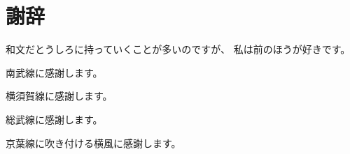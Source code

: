 \chapter*{謝辞}

和文だとうしろに持っていくことが多いのですが、
私は前のほうが好きです。


南武線に感謝します。

横須賀線に感謝します。

総武線に感謝します。

京葉線に吹き付ける横風に感謝します。
